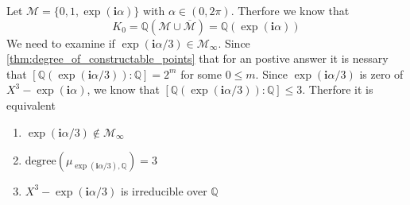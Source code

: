 Let $\mathcal{M} = \{0,1,\exp(\textbf{i} \alpha)\}$ with $\alpha \in (0,2\pi)$. Therfore we know that
\begin{equation*}
    K_0 = \mathbb{Q}(\mathcal{M}\cup \overline{\mathcal{M}}) = \mathbb{Q}(\exp(\textbf{i} \alpha))
\end{equation*}
We need to examine if $\exp(\textbf{i} \alpha/3) \in \mathcal{M}_{\infty}$. Since \ref{thm:degree_of_constructable_points}
that for an postive answer it is nessary that $[\mathbb{Q}(\exp(\textbf{i} \alpha/3)):\mathbb{Q}] = 2^m$ for some $0 \le m $. \newline
Since $\exp(\textbf{i} \alpha/3)$ is zero of $X^3 - \exp(\textbf{i} \alpha)$, we know that $[\mathbb{Q}(\exp(\textbf{i} \alpha/3)):\mathbb{Q}] \le 3$.
Therfore it is equivalent
\begin{enumerate}
    \item $\exp(\textbf{i} \alpha/3) \notin \mathcal{M}_{\infty}$
    \item $\text{degree}(\mu_{\exp(\textbf{i} \alpha/3),\mathbb{Q}}) = 3$
    \item $X^3 - \exp(\textbf{i} \alpha/3)$ is irreducible over $\mathbb{Q}$
\end{enumerate}


